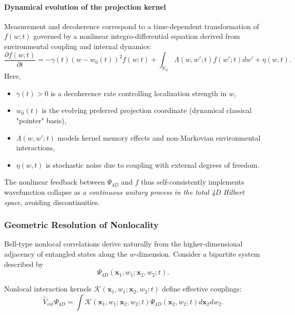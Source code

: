 \documentclass[12pt]{article}
\begin{document}
\paragraph{Dynamical evolution of the projection kernel}

Measurement and decoherence correspond to a time-dependent transformation of $f(w; t)$ governed by a nonlinear integro-differential equation derived from environmental coupling and internal dynamics:
\begin{equation}
    \frac{\partial f(w; t)}{\partial t} = - \gamma(t) (w - w_0(t))^2 f(w; t) + \int_{\mathbb{R}_w} \Lambda(w, w'; t) f(w'; t) dw' + \eta(w, t).
    \label{eq:kernel_evolution_full}
\end{equation}
Here,
\begin{itemize}
    \item $\gamma(t) > 0$ is a decoherence rate controlling localization strength in $w$,
    \item $w_0(t)$ is the evolving preferred projection coordinate (dynamical classical "pointer" basis),
    \item $\Lambda(w, w'; t)$ models kernel memory effects and non-Markovian environmental interactions,
    \item $\eta(w, t)$ is stochastic noise due to coupling with external degrees of freedom.
\end{itemize}

The nonlinear feedback between $\Psi_{4D}$ and $f$ thus self-consistently implements wavefunction collapse as a \emph{continuous unitary process in the total 4D Hilbert space}, avoiding discontinuities.

\vspace{1em}
\subsubsection*{Geometric Resolution of Nonlocality}

Bell-type nonlocal correlations derive naturally from the higher-dimensional adjacency of entangled states along the $w$-dimension. Consider a bipartite system described by
\begin{equation}
    \Psi_{4D}(\mathbf{x}_1, w_1; \mathbf{x}_2, w_2; t).
\end{equation}

Nonlocal interaction kernels $\mathcal{K}(\mathbf{x}_1, w_1; \mathbf{x}_2, w_2; t)$ define effective couplings:
\begin{equation}
    \hat{V}_{int} \Psi_{4D} = \int \mathcal{K}(\mathbf{x}_1, w_1; \mathbf{x}_2, w_2; t) \Psi_{4D}(\mathbf{x}_2, w_2; t) d\mathbf{x}_2 dw_2.
    \label{eq:nonlocal_kernel}
\end{equation}
\end{document}
